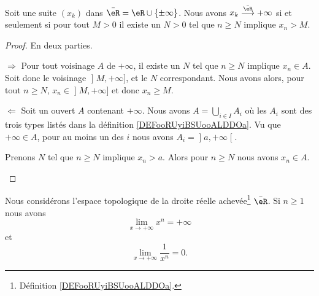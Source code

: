 \begin{proposition}
    Soit une suite \( (x_k)\) dans \( \bar \eR=\eR\cup\{ \pm\infty \}\). Nous avons \( x_k\stackrel{\bar \eR}{\longrightarrow}+\infty\) si et seulement si pour tout \( M>0\) il existe un \( N>0\) tel que \( n\geq N\) implique \( x_n>M\).
\end{proposition}

\begin{proof}
    En deux parties.
    \begin{subproof}
        \item[\( \Rightarrow\)]
            Pour tout voisinage \( A\) de \( +\infty\), il existe un \( N\) tel que \( n\geq N\) implique \( x_n\in A\). Soit donc le voisinage \( \mathopen] M , +\infty \mathclose]\), et le \( N\) correspondant. Nous avons alors, pour tout \( n\geq N\), \( x_n\in \mathopen] M , +\infty \mathclose]\) et donc \( x_n\geq M\).
        \item[\( \Leftarrow\)]
        Soit un ouvert \( A\) contenant \( +\infty\). Nous avons \( A=\bigcup_{i\in I} A_i\) où les \( A_i\) sont des trois types listés dans la définition \ref{DEFooRUyiBSUooALDDOa}. Vu que \( +\infty\in A\), pour au moins un des \( i\) nous avons \( A_i=\mathopen] a , +\infty \mathclose[\).

            Prenons \( N\) tel que \( n\geq N\) implique \( x_n>a\). Alors pour \( n\geq N\) nous avons \( x_n\in A\).
    \end{subproof}
\end{proof}

\begin{lemma}       \label{LEMooFCIXooJuHFqk}
    Nous considérons l'espace topologique de la droite réelle achevée\footnote{Définition \ref{DEFooRUyiBSUooALDDOa}.} \( \bar \eR\). Si \( n\geq 1\) nous avons 
    \begin{equation}        \label{EQooRRFEooLYcuRP}
        \lim_{x\to +\infty} x^n = +\infty
    \end{equation}
    et
    \begin{equation}
        \lim_{x\to +\infty} \frac{1}{ x^n }=0.
    \end{equation}
\end{lemma}

